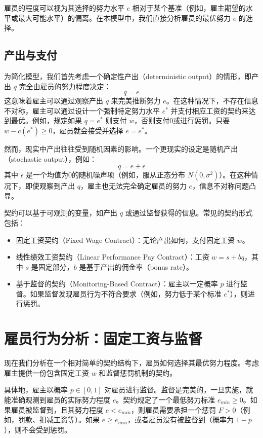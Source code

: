 雇员的程度可以视为其选择的努力水平 $e$ 相对于某个基准（例如，雇主期望的水平或最大可能水平）的偏离。在本模型中，我们直接分析雇员的最优努力 $e$ 的选择。

\subsection{产出与支付}

为简化模型，我们首先考虑一个确定性产出（deterministic output）的情形，即产出 $q$ 完全由雇员的努力程度决定：
\begin{equation}
q = e
\end{equation}
这意味着雇主可以通过观察产出 $q$ 来完美推断努力 $e$。在这种情况下，不存在信息不对称，雇主可以通过设计一个强制特定努力水平 $e^*$ 并支付相应工资的契约来达到最优。例如，规定如果 $q=e^*$ 则支付 $w$，否则支付0或进行惩罚。只要 $w - c(e^*) \ge 0$，雇员就会接受并选择 $e=e^*$。

然而，现实中产出往往受到随机因素的影响。一个更现实的设定是随机产出（stochastic output），例如：
\begin{equation}
q = e + \epsilon
\end{equation}
其中 $\epsilon$ 是一个均值为0的随机噪声项（例如，服从正态分布 $N(0, \sigma^2)$）。在这种情况下，即使观察到产出 $q$，雇主也无法完全确定雇员的努力 $e$，信息不对称问题凸显。

契约可以基于可观测的变量，如产出 $q$ 或通过监督获得的信息。常见的契约形式包括：
\begin{itemize}
    \item 固定工资契约（Fixed Wage Contract）：无论产出如何，支付固定工资 $w$。
    \item 线性绩效工资契约（Linear Performance Pay Contract）：工资 $w = s + bq$，其中 $s$ 是固定部分，$b$ 是基于产出的佣金率（bonus rate）。
    \item 基于监督的契约（Monitoring-Based Contract）：雇主以一定概率 $p$ 进行监督。如果监督发现雇员行为不符合要求（例如，努力低于某个标准 $e^*$），则进行惩罚。
\end{itemize}

\section{雇员行为分析：固定工资与监督}
\label{sec:agent_behavior_monitor}

现在我们分析在一个相对简单的契约结构下，雇员如何选择其最优努力程度。考虑雇主提供一份包含固定工资 $w$ 和监督惩罚机制的契约。

具体地，雇主以概率 $p \in [0, 1]$ 对雇员进行监督。监督是完美的，一旦实施，就能准确观测到雇员的实际努力程度 $e$。契约规定了一个最低努力标准 $e_{min} \ge 0$。如果雇员被监督到，且其努力程度 $e < e_{min}$，则雇员需要承担一个惩罚 $F > 0$（例如，罚款、扣减工资等）。如果 $e \ge e_{min}$，或者雇员没有被监督到（概率为 $1-p$），则不会受到惩罚。

